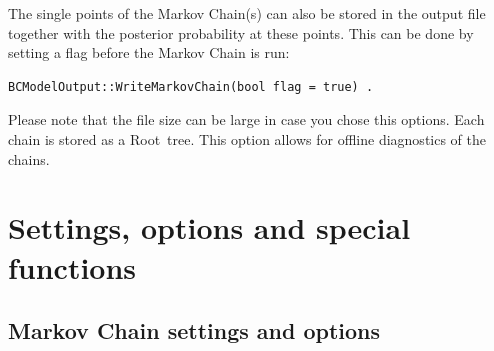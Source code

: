 \documentclass[11pt, a4paper]{article}
\newcommand{\Root}{{\sc Root}}
\begin{document}
The single points of the Markov Chain(s) can also be stored in the
output file together with the posterior probability at these
points. This can be done by setting a flag before the Markov Chain is
run:
%
\begin{verbatim}
BCModelOutput::WriteMarkovChain(bool flag = true) . 
\end{verbatim}
%
Please note that the file size can be large in case you chose this
options. Each chain is stored as a \Root\ tree. This option allows for
offline diagnostics of the chains. 


\section{Settings, options and special functions}
\label{section:settings}


\subsection{Markov Chain settings and options}
\end{document}
